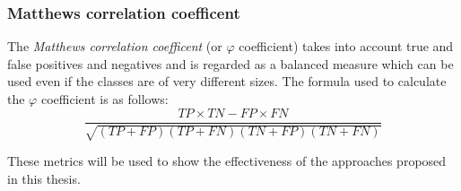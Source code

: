             \subsubsection{Matthews correlation coefficent} 
                The \textit{Matthews correlation coefficent} (or $\varphi$ coefficient) takes into account true and false positives and negatives and is regarded as a balanced measure which can be used even if the classes are of very different sizes. The formula used to calculate the $\varphi$ coefficient is as follows: 
                \begin{equation}
                    \frac{TP \times TN - FP \times FN}{\sqrt{(TP + FP)(TP + FN)(TN + FP)(TN + FN)}}
                \end{equation}

            These metrics will be used to show the effectiveness of the approaches proposed in this thesis.
    

        

